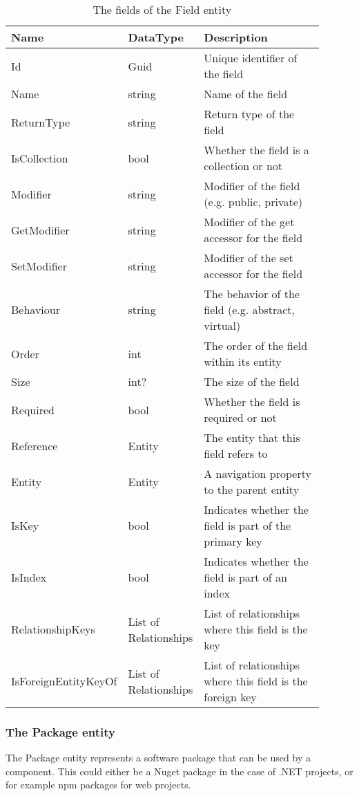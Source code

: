 \begin{table}[H]
\small
\begin{tabular}{ p{0.23\linewidth} p{0.23\linewidth} p{0.44\linewidth} }
\hline
\textbf{Name} & \textbf{DataType} & \textbf{Description} \\
\hline
Id & Guid & Unique identifier of the field \\
Name & string & Name of the field \\
ReturnType & string & Return type of the field \\
IsCollection & bool & Whether the field is a collection or not \\
Modifier & string & Modifier of the field (e.g. public, private) \\
GetModifier & string & Modifier of the get accessor for the field \\
SetModifier & string & Modifier of the set accessor for the field \\
Behaviour & string & The behavior of the field (e.g. abstract, virtual) \\
Order & int & The order of the field within its entity \\
Size & int? & The size of the field \\
Required & bool & Whether the field is required or not \\
Reference & Entity & The entity that this field refers to\\
Entity & Entity & A navigation property to the parent entity \\
IsKey & bool & Indicates whether the field is part of the primary key \\
IsIndex & bool & Indicates whether the field is part of an index \\
RelationshipKeys & List of Relationships & List of relationships where this field is the key \\
IsForeignEntityKeyOf & List of Relationships & List of relationships where this field is the foreign key \\
\hline
\end{tabular}
\caption{The fields of the Field entity}
\label{table:field_entity}
\end{table}

\subsubsection{The Package entity}

The Package entity represents a software package that can be used by a component. This
could either be a Nuget package in the case of .NET projects, or for example npm packages
for web projects.

